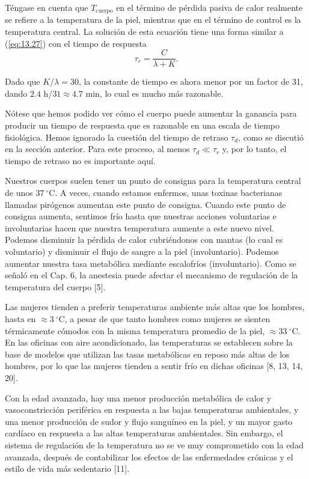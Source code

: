\documentclass[12pt]{book}
\begin{document}
Téngase en cuenta que $T_{\text{cuerpo}}$ en el término de pérdida pasiva de calor realmente se refiere a la temperatura de la piel, mientras que en el término de control es la temperatura central. La solución de esta ecuación tiene una forma similar a (\ref{eq:13.27}) con el tiempo de respuesta
\begin{equation}
  \tau_r = \frac{C}{\lambda + K}. \label{eq:13.33}
\end{equation}

Dado que $K/\lambda = 30$, la constante de tiempo es ahora menor por un factor de 31, dando $2.4\text{ h}/31 \approx 4.7\text{ min}$, lo cual es mucho más razonable.

Nótese que hemos podido ver cómo el cuerpo puede aumentar la ganancia para producir un tiempo de respuesta que es razonable en una escala de tiempo fisiológica. Hemos ignorado la cuestión del tiempo de retraso $\tau_d$, como se discutió en la sección anterior. Para este proceso, al menos $\tau_d \ll \tau_r$ y, por lo tanto, el tiempo de retraso no es importante aquí.

Nuestros cuerpos suelen tener un punto de consigna para la temperatura central de unos $37\ ^\circ\text{C}$. A veces, cuando estamos enfermos, unas toxinas bacterianas llamadas pirógenos aumentan este punto de consigna. Cuando este punto de consigna aumenta, sentimos frío hasta que nuestras acciones voluntarias e involuntarias hacen que nuestra temperatura aumente a este nuevo nivel. Podemos disminuir la pérdida de calor cubriéndonos con mantas (lo cual es voluntario) y disminuir el flujo de sangre a la piel (involuntario). Podemos aumentar nuestra tasa metabólica mediante escalofríos (involuntario). Como se señaló en el Cap. 6, la anestesia puede afectar el mecanismo de regulación de la temperatura del cuerpo [5].

Las mujeres tienden a preferir temperaturas ambiente más altas que los hombres, hasta en $\approx 3\ ^\circ\text{C}$, a pesar de que tanto hombres como mujeres se sienten térmicamente cómodos con la misma temperatura promedio de la piel, $\approx 33\ ^\circ\text{C}$. En las oficinas con aire acondicionado, las temperaturas se establecen sobre la base de modelos que utilizan las tasas metabólicas en reposo más altas de los hombres, por lo que las mujeres tienden a sentir frío en dichas oficinas [8, 13, 14, 20].

Con la edad avanzada, hay una menor producción metabólica de calor y vasoconstricción periférica en respuesta a las bajas temperaturas ambientales, y una menor producción de sudor y flujo sanguíneo en la piel, y un mayor gasto cardíaco en respuesta a las altas temperaturas ambientales. Sin embargo, el sistema de regulación de la temperatura no se ve muy comprometido con la edad avanzada, después de contabilizar los efectos de las enfermedades crónicas y el estilo de vida más sedentario [11].
\end{document}
